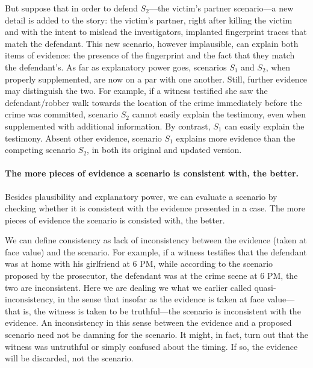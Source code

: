 \documentclass[10pt]{article}
\begin{document}
But suppose that in order to defend $S_2$---the victim's 
partner scenario---a new detail is added to the story: the victim's partner, right after killing the victim and with the intent to mislead the investigators, 
implanted fingerprint traces that match the defendant. This new scenario, however implausible, can 
explain both items of evidence: the presence of the fingerprint 
and the fact that they match the defendant's. As far as explanatory power goes, 
scenarios $S_1$ and $S_2$, when properly supplemented, are now on a par with one another. Still, further evidence may distinguish the two. 
For example, if a witness testified she saw the defendant/robber walk towards the location of the crime immediately before the crime was committed, 
scenario $S_2$ cannot easily explain the testimony, even when supplemented with additional information. By contrast, 
$S_1$ can easily explain the testimony. Absent other evidence, scenario $S_1$ explains 
more evidence than the competing scenario $S_2$, in both its original and updated version. 
 

\paragraph{The more pieces of evidence a scenario is consistent with, the better.}

Besides plausibility and explanatory power, we can evaluate a scenario by checking whether it is 
consistent with the evidence presented in a case. 
The more pieces of evidence the scenario 
is consisted with, the better.

We can define consistency as lack of inconsistency between the evidence (taken at face value) and the scenario. 
For example, if a witness testifies that the defendant was at home with his girlfriend 
at 6 PM, while according to the scenario proposed by the prosecutor, 
the defendant was at the crime scene at 6 PM, the 
two are inconsistent. Here we are dealing we what we earlier called quasi-inconsistency, in the sense that
insofar as the evidence is taken at face value---that is, the witness is taken to be truthful---the scenario 
is inconsistent with the evidence. An inconsistency in this sense between the evidence and a proposed scenario need 
not be damning for the scenario. It might, in fact, turn out that the witness was untruthful or simply confused about 
the timing. If so, the evidence will be discarded, not the scenario. 
\end{document}
